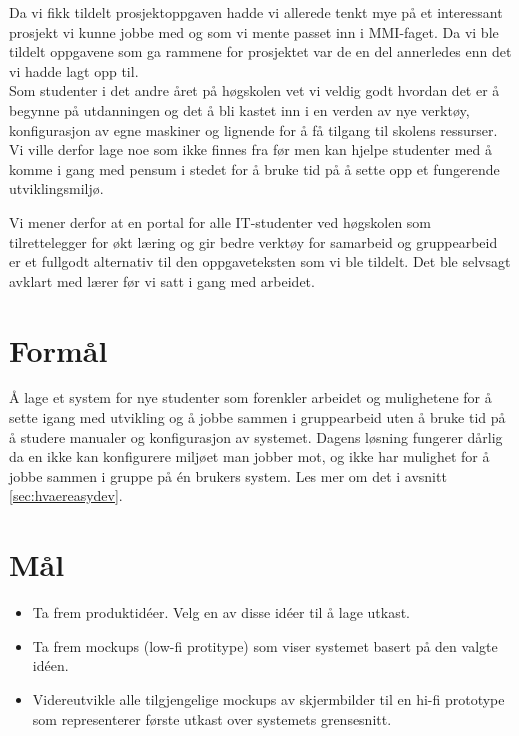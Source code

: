 Da vi fikk tildelt prosjektoppgaven hadde vi allerede tenkt mye på et interessant prosjekt vi kunne jobbe med og som vi mente passet inn i MMI-faget. Da vi ble tildelt oppgavene som ga rammene for prosjektet var de en del annerledes enn det vi hadde lagt opp til.\\

Som studenter i det andre året på høgskolen vet vi veldig godt hvordan det er å begynne på utdanningen og det å bli kastet inn i en verden av nye verktøy, konfigurasjon av egne maskiner og lignende for å få tilgang til skolens ressurser. Vi ville derfor lage noe som ikke finnes fra før men kan hjelpe studenter med å komme i gang med pensum i stedet for å bruke tid på å sette opp et fungerende utviklingsmiljø.

Vi mener derfor at en portal for alle IT-studenter ved høgskolen som tilrettelegger for økt læring og gir bedre verktøy for samarbeid og gruppearbeid er et fullgodt alternativ til den oppgaveteksten som vi ble tildelt. Det ble selvsagt avklart med lærer før vi satt i gang med arbeidet. 

\section{Formål}
Å lage et system for nye studenter som forenkler arbeidet og mulighetene for å sette igang med utvikling og å jobbe sammen i gruppearbeid uten å bruke tid på å studere manualer og konfigurasjon av systemet. Dagens løsning fungerer dårlig da en ikke kan konfigurere miljøet man jobber mot, og ikke har mulighet for å jobbe sammen i gruppe på én brukers system. Les mer om det i avsnitt \ref{sec:hvaereasydev}.

\section{Mål}
\begin{itemize}
\setlength{\itemsep}{1pt}
\setlength{\parskip}{0pt}
\setlength{\parsep}{0pt}
\item Ta frem produktidéer. Velg en av disse idéer til å lage utkast.
\item Ta frem mockups (low-fi protitype) som viser systemet basert på den valgte idéen.
\item Videreutvikle alle tilgjengelige mockups av skjermbilder til en hi-fi prototype som representerer første utkast over systemets grensesnitt.
\end{itemize}

